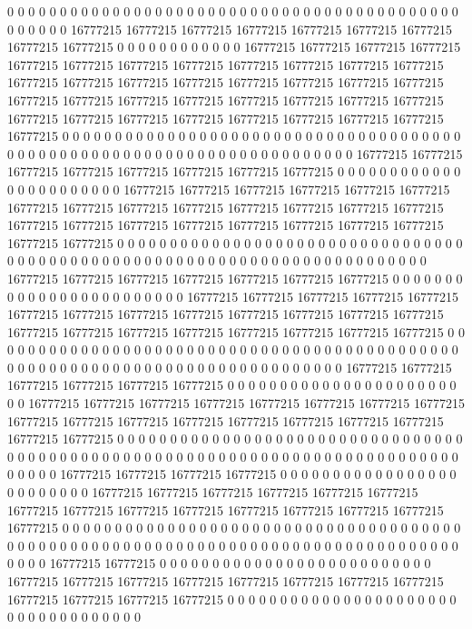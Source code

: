 0 0 0 0 0 0 0 0 0 0 0 0 0 0 0 0 0 0 0 0 0 0 0 0 0 0 0 0 0 0 0 0 0 0 0 0 0 0 0 0 0 0 0 0 0 0 0 0 0 16777215 16777215 16777215 16777215 16777215 16777215 16777215 16777215 16777215 0 0 0 0 0 0 0 0 0 0 0 0 16777215 16777215 16777215 16777215 16777215 16777215 16777215 16777215 16777215 16777215 16777215 16777215 16777215 16777215 16777215 16777215 16777215 16777215 16777215 16777215 16777215 16777215 16777215 16777215 16777215 16777215 16777215 16777215 16777215 16777215 16777215 16777215 16777215 16777215 16777215 16777215 16777215 0 0 0 0 0 0 0 0 0 0 0 0 0 0 0 0 0 0 0 0 0
0 0 0 0 0 0 0 0 0 0 0 0 0 0 0 0 0 0 0 0 0 0 0 0 0 0 0 0 0 0 0 0 0 0 0 0 0 0 0 0 0 0 0 0 0 0 0 0 0 0 16777215 16777215 16777215 16777215 16777215 16777215 16777215 16777215 0 0 0 0 0 0 0 0 0 0 0 0 0 0 0 0 0 0 0 0 0 0 0 16777215 16777215 16777215 16777215 16777215 16777215 16777215 16777215 16777215 16777215 16777215 16777215 16777215 16777215 16777215 16777215 16777215 16777215 16777215 16777215 16777215 16777215 16777215 16777215 0 0 0 0 0 0 0 0 0 0 0 0 0 0 0 0 0 0 0 0 0 0 0
0 0 0 0 0 0 0 0 0 0 0 0 0 0 0 0 0 0 0 0 0 0 0 0 0 0 0 0 0 0 0 0 0 0 0 0 0 0 0 0 0 0 0 0 0 0 0 0 0 0 16777215 16777215 16777215 16777215 16777215 16777215 16777215 0 0 0 0 0 0 0 0 0 0 0 0 0 0 0 0 0 0 0 0 0 0 0 0 16777215 16777215 16777215 16777215 16777215 16777215 16777215 16777215 16777215 16777215 16777215 16777215 16777215 16777215 16777215 16777215 16777215 16777215 16777215 16777215 16777215 0 0 0 0 0 0 0 0 0 0 0 0 0 0 0 0 0 0 0 0 0 0 0 0 0 0
0 0 0 0 0 0 0 0 0 0 0 0 0 0 0 0 0 0 0 0 0 0 0 0 0 0 0 0 0 0 0 0 0 0 0 0 0 0 0 0 0 0 0 0 0 0 0 0 0 0 0 16777215 16777215 16777215 16777215 16777215 16777215 0 0 0 0 0 0 0 0 0 0 0 0 0 0 0 0 0 0 0 0 0 0 0 0 16777215 16777215 16777215 16777215 16777215 16777215 16777215 16777215 16777215 16777215 16777215 16777215 16777215 16777215 16777215 16777215 16777215 16777215 0 0 0 0 0 0 0 0 0 0 0 0 0 0 0 0 0 0 0 0 0 0 0 0 0 0 0 0 0
0 0 0 0 0 0 0 0 0 0 0 0 0 0 0 0 0 0 0 0 0 0 0 0 0 0 0 0 0 0 0 0 0 0 0 0 0 0 0 0 0 0 0 0 0 0 0 0 0 0 0 0 16777215 16777215 16777215 16777215 0 0 0 0 0 0 0 0 0 0 0 0 0 0 0 0 0 0 0 0 0 0 0 0 0 16777215 16777215 16777215 16777215 16777215 16777215 16777215 16777215 16777215 16777215 16777215 16777215 16777215 16777215 16777215 0 0 0 0 0 0 0 0 0 0 0 0 0 0 0 0 0 0 0 0 0 0 0 0 0 0 0 0 0 0 0 0
0 0 0 0 0 0 0 0 0 0 0 0 0 0 0 0 0 0 0 0 0 0 0 0 0 0 0 0 0 0 0 0 0 0 0 0 0 0 0 0 0 0 0 0 0 0 0 0 0 0 0 0 0 16777215 16777215 0 0 0 0 0 0 0 0 0 0 0 0 0 0 0 0 0 0 0 0 0 0 0 0 0 0 16777215 16777215 16777215 16777215 16777215 16777215 16777215 16777215 16777215 16777215 16777215 16777215 0 0 0 0 0 0 0 0 0 0 0 0 0 0 0 0 0 0 0 0 0 0 0 0 0 0 0 0 0 0 0 0 0 0 0
